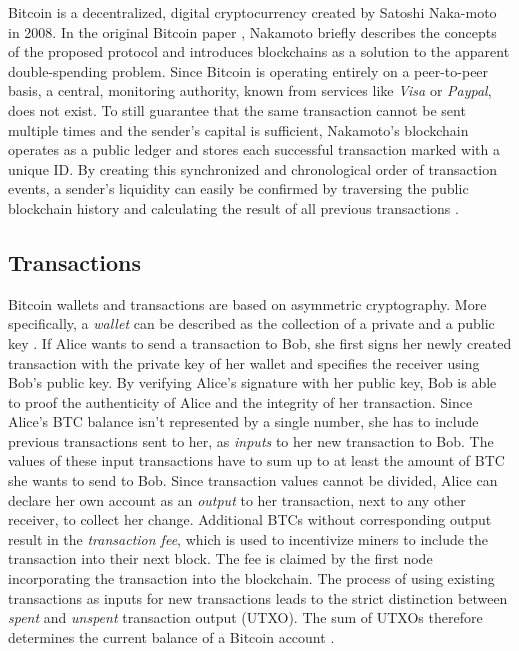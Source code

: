 \documentclass[a4paper,12pt,twoside]{report}
\begin{document}
 Bitcoin is a decentralized, digital cryptocurrency created by Satoshi Naka-moto in 2008. In the original Bitcoin paper \cite{nakamoto2008bitcoin}, Nakamoto briefly describes the concepts of the proposed protocol and introduces blockchains as a solution to the apparent double-spending problem. Since Bitcoin is operating entirely on a peer-to-peer basis, a central, monitoring authority, known from services like \textit{Visa} or \textit{Paypal}, does not exist. To still guarantee that the same transaction cannot be sent multiple times and the sender's capital is sufficient, Nakamoto's blockchain operates as a public ledger and stores each successful transaction marked with a unique ID. By creating this synchronized and chronological order of transaction events, a sender's liquidity can easily be confirmed by traversing the public blockchain history and calculating the result of all previous transactions \cite{nakamoto2008bitcoin,bitcoinwiki}.

\subsection{Transactions}
Bitcoin wallets and transactions are based on asymmetric cryptography. More specifically, a \textit{wallet} can be described as the collection of a private and a public key \cite{okupski2014bitcoin}. If Alice wants to send a transaction to Bob, she first signs her newly created transaction with the private key of her wallet and specifies the receiver using Bob's public key. By verifying Alice's signature with her public key, Bob is able to proof the authenticity of Alice and the integrity of her transaction. Since Alice's BTC balance isn't represented by a single number, she has to include previous transactions sent to her, as \textit{inputs} to her new transaction to Bob. The values of these input transactions have to sum up to at least the amount of BTC she wants to send to Bob. Since transaction values cannot be divided, Alice can declare her own account as an \textit{output} to her transaction, next to any other receiver, to collect her change. Additional BTCs without corresponding output result in the \textit{transaction fee}, which is used to incentivize miners to include the transaction into their next block. The fee is claimed by the first node incorporating the transaction into the blockchain. The process of using existing transactions as inputs for new transactions leads to the strict distinction between \textit{spent} and \textit{unspent} transaction output (UTXO). The sum of UTXOs therefore determines the current balance of a Bitcoin account \cite{antonopoulos2017mastering}.
\end{document}
